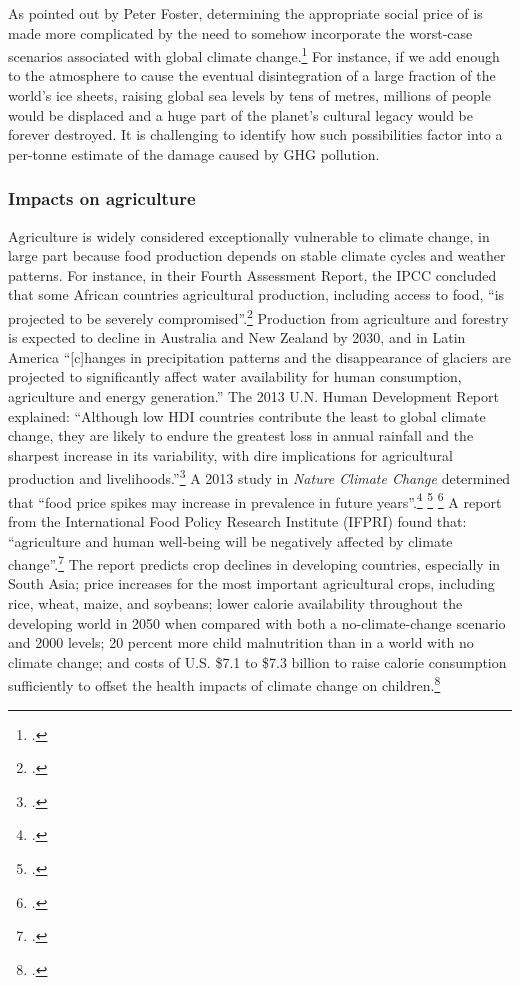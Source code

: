 As pointed out by Peter Foster, determining the appropriate social price of  is made more complicated by the need to somehow incorporate the worst-case scenarios associated with global climate change.\footcite[][]{ApocExternal}
For instance, if we add enough  to the atmosphere to cause the eventual disintegration of a large fraction of the world's ice sheets, raising global sea levels by tens of metres, millions of people would be displaced and a huge part of the planet's cultural legacy would be forever destroyed.
It is challenging to identify how such possibilities factor into a per-tonne estimate of the damage caused by GHG pollution.



	\subsubsection{Impacts on agriculture}



Agriculture is widely considered exceptionally vulnerable to climate change, in large part because food production depends on stable climate cycles and weather patterns.
For instance, in their Fourth Assessment Report, the IPCC concluded that some African countries agricultural production, including access to food, ``is projected to be severely compromised''.\footcite[][See: Synthesis report, Table SPM.2. Examples of some projected regional impacts. \url{https://www.ipcc.ch/publications_and_data/ar4/syr/en/spms3.html}]{IPCC2007}
Production from agriculture and forestry is expected to decline in Australia and New Zealand by 2030, and in Latin America ``[c]hanges in precipitation patterns and the disappearance of glaciers are projected to significantly affect water availability for human consumption, agriculture and energy generation.''
The 2013 U.N. Human Development Report explained: ``Although low HDI countries contribute the least to global climate change, they are likely to endure the greatest loss in annual rainfall and the sharpest increase in its variability, with dire implications for agricultural production and livelihoods.''\footcite[][p. 6]{UNHumanDev2013}
A 2013 study in \emph{Nature Climate Change} determined that ``food price spikes may increase in prevalence in future years''.\footcite[][p. 1]{Iizumi2013} \footcite[][]{IPCCExtremeEvents} \footcite[][p. 271--289]{Funk2009}
A report from the International Food Policy Research Institute (IFPRI) found that: ``agriculture and human well-being will 
be negatively affected by climate change''.\footcite[][p. vii]{IFPRIAgri}
The report predicts crop declines in developing countries, especially in South Asia; price increases for the most important agricultural crops, including rice, wheat, maize, and soybeans; lower calorie availability throughout the developing world in 2050 when compared with both a no-climate-change scenario and 2000 levels; 20 percent more child malnutrition than in a world with no climate change; and costs of U.S. \$7.1 to \$7.3 billion to raise calorie consumption sufficiently to offset the health impacts of climate change on children.\footcite[][p. vii]{IFPRIAgri}



